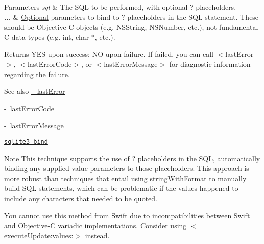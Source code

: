 \begin{DoxyParams}{Parameters}
{\em sql} & The S\+QL to be performed, with optional {\ttfamily ?} placeholders.\\
\hline
{\em ...} & \mbox{\hyperlink{protocol_optional-p}{Optional}} parameters to bind to {\ttfamily ?} placeholders in the S\+QL statement. These should be Objective-\/C objects (e.\+g. {\ttfamily N\+S\+String}, {\ttfamily N\+S\+Number}, etc.), not fundamental C data types (e.\+g. {\ttfamily int}, {\ttfamily char $\ast$}, etc.).\\
\hline
\end{DoxyParams}
\begin{DoxyReturn}{Returns}
{\ttfamily Y\+ES} upon success; {\ttfamily NO} upon failure. If failed, you can call {\ttfamily $<$last\+Error$>$}, {\ttfamily $<$last\+Error\+Code$>$}, or {\ttfamily $<$last\+Error\+Message$>$} for diagnostic information regarding the failure.
\end{DoxyReturn}
\begin{DoxySeeAlso}{See also}
\mbox{\hyperlink{interface_o_p_t_l_y_f_m_d_b_database_a477a6ff4d9daaac53a56c0a058a0d2f7}{-\/ last\+Error}} 

\mbox{\hyperlink{interface_o_p_t_l_y_f_m_d_b_database_a9f15cf87d3c764783ce0c6beb39393a9}{-\/ last\+Error\+Code}} 

\mbox{\hyperlink{interface_o_p_t_l_y_f_m_d_b_database_a082c5d58576df07956308656064e1f63}{-\/ last\+Error\+Message}} 

\href{http://sqlite.org/c3ref/bind_blob.html}{\tt {\ttfamily sqlite3\+\_\+bind}}
\end{DoxySeeAlso}
\begin{DoxyNote}{Note}
This technique supports the use of {\ttfamily ?} placeholders in the S\+QL, automatically binding any supplied value parameters to those placeholders. This approach is more robust than techniques that entail using {\ttfamily string\+With\+Format} to manually build S\+QL statements, which can be problematic if the values happened to include any characters that needed to be quoted.

You cannot use this method from Swift due to incompatibilities between Swift and Objective-\/C variadic implementations. Consider using {\ttfamily $<$execute\+Update\+:values\+:$>$} instead. 
\end{DoxyNote}
\mbox{\label{interface_o_p_t_l_y_f_m_d_b_database_a0d75e3c094f6e03946a5b8278a215c42}} 
